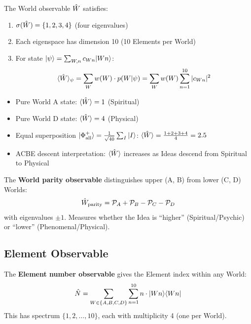 \begin{proposition}
\label{prop:world-observable}
The World observable $\hat{W}$ satisfies:
\begin{enumerate}
  \item $\sigma(\hat{W}) = \{1, 2, 3, 4\}$ (four eigenvalues)
  \item Each eigenspace has dimension 10 (10 Elements per World)
  \item For state $|\psi\rangle = \sum_{W,n} c_{Wn}|Wn\rangle$:
  \[
  \langle \hat{W} \rangle_\psi = \sum_W w(W) \cdot p(W|\psi) = \sum_W w(W) \sum_{n=1}^{10} |c_{Wn}|^2
  \]
\end{enumerate}
\end{proposition}

\begin{example}
\label{ex:world-expectations}
\begin{itemize}
  \item Pure World A state: $\langle \hat{W} \rangle = 1$ (Spiritual)
  \item Pure World D state: $\langle \hat{W} \rangle = 4$ (Physical)
  \item Equal superposition $|\Phi^+_{\mathrm{all}}\rangle = \frac{1}{\sqrt{40}}\sum_I |I\rangle$: $\langle \hat{W} \rangle = \frac{1+2+3+4}{4} = 2.5$
  \item ACBE descent interpretation: $\langle \hat{W} \rangle$ increases as Ideas descend from Spiritual to Physical
\end{itemize}
\end{example}

\begin{definition}
\label{def:world-parity}
The \textbf{World parity observable} distinguishes upper (A, B) from lower (C, D) Worlds:
\[
\hat{W}_{\mathrm{parity}} = \mathcal{P}_A + \mathcal{P}_B - \mathcal{P}_C - \mathcal{P}_D
\]
with eigenvalues $\pm 1$. Measures whether the Idea is ``higher'' (Spiritual/Psychic) or ``lower'' (Phenomenal/Physical).
\end{definition}

\subsection{Element Observable}

\begin{definition}
\label{def:element-observable}
The \textbf{Element number observable} gives the Element index within any World:
\[
\hat{N} = \sum_{W \in \{A,B,C,D\}} \sum_{n=1}^{10} n \cdot |Wn\rangle\langle Wn|
\]
This has spectrum $\{1, 2, \ldots, 10\}$, each with multiplicity 4 (one per World).
\end{definition}

